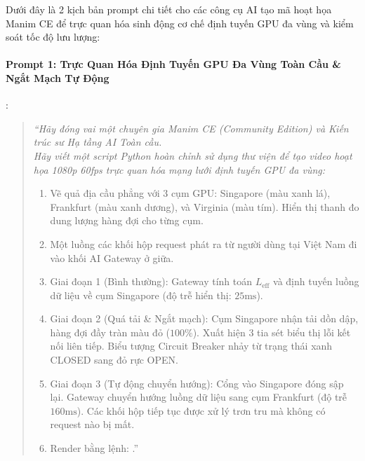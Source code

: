 \begin{simulationbox}
Dưới đây là 2 kịch bản prompt chi tiết cho các công cụ AI tạo mã hoạt họa Manim CE để trực quan hóa sinh động cơ chế định tuyến GPU đa vùng và kiểm soát tốc độ lưu lượng:

\paragraph{Prompt 1: Trực Quan Hóa Định Tuyến GPU Đa Vùng Toàn Cầu \& Ngắt Mạch Tự Động}:
\begin{quote}
\small\itshape
``Hãy đóng vai một chuyên gia Manim CE (Community Edition) và Kiến trúc sư Hạ tầng AI Toàn cầu. \\
Hãy viết một script Python hoàn chỉnh sử dụng thư viện  để tạo video hoạt họa 1080p 60fps trực quan hóa mạng lưới định tuyến GPU đa vùng:
\begin{enumerate}
  \item Vẽ quả địa cầu phẳng với 3 cụm GPU: Singapore (màu xanh lá), Frankfurt (màu xanh dương), và Virginia (màu tím). Hiển thị thanh đo dung lượng hàng đợi cho từng cụm.
  \item Một luồng các khối hộp request phát ra từ người dùng tại Việt Nam đi vào khối AI Gateway ở giữa.
  \item Giai đoạn 1 (Bình thường): Gateway tính toán $L_{\text{eff}}$ và định tuyến luồng dữ liệu về cụm Singapore (độ trễ hiển thị: $25\text{ms}$).
  \item Giai đoạn 2 (Quá tải \& Ngắt mạch): Cụm Singapore nhận tải dồn dập, hàng đợi đầy tràn màu đỏ ($100\%$). Xuất hiện 3 tia sét biểu thị lỗi kết nối liên tiếp. Biểu tượng Circuit Breaker nhảy từ trạng thái xanh CLOSED sang đỏ rực OPEN.
  \item Giai đoạn 3 (Tự động chuyển hướng): Cổng vào Singapore đóng sập lại. Gateway chuyển hướng luồng dữ liệu sang cụm Frankfurt (độ trễ $160\text{ms}$). Các khối hộp tiếp tục được xử lý trơn tru mà không có request nào bị mất.
  \item Render bằng lệnh: .''
\end{enumerate}
\end{quote}


\end{simulationbox}
